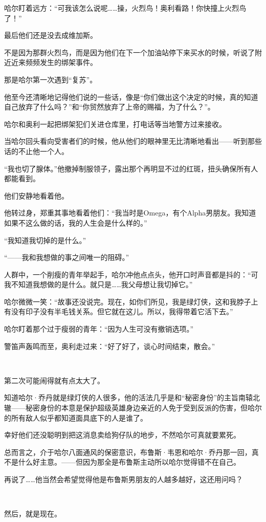 \documentclass[../main]{subfiles}
\begin{document}
哈尔盯着远方：“可我该怎么说呢……操，火烈鸟！奥利看路！你快撞上火烈鸟了！”

最后他们还是没去成维加斯。

不是因为那群火烈鸟，而是因为他们在下一个加油站停下来买水的时候，听说了附近近来频频发生的绑架事件。

那是哈尔第一次遇到“复苏”。

他至今还清晰地记得他们说的一些话，像是“你们做出这个决定的时候，真的知道自己放弃了什么吗？”和“你贸然放弃了上帝的赐福，为了什么？”。

哈尔和奥利一起把绑架犯们关进仓库里，打电话等当地警方过来接收。

当哈尔回头看向受害者们的时候，他从他们的眼神里无比清晰地看出——听到那些话的不止他一个人。

“我也切了腺体。”他撤掉制服领子，露出那个再明显不过的红斑，扭头确保所有人都能看到。

他们安静地看着他。

他转过身，郑重其事地看着他们：“我当时是Omega，有个Alpha男朋友。我知道如果不这么做的话，我的人生会是什么样的。”

“我知道我切掉的是什么。”

“——我和我想做的事之间唯一的阻碍。”

人群中，一个削瘦的青年举起手，哈尔冲他点点头，他开口时声音都是抖的：“可我不知道我想做的是什么。就只是……我父母想让我切掉它。”

哈尔微微一笑：“故事还没说完。现在，如你们所见，我是绿灯侠，这和我脖子上有没有印子没有半毛钱关系。但它就在这儿。所以，我得带着它活下去。”

哈尔盯着那个过于瘦弱的青年：“因为人生可没有撤销选项。”

警笛声轰鸣而至，奥利走过来：“好了好了，谈心时间结束，散会。”

~\

第二次可能闹得就有点太大了。

知道哈尔·乔丹就是绿灯侠的人很多，他的活法几乎是和“秘密身份”的主旨南辕北辙——秘密身份的本意是保护超级英雄身边亲近的人免于受到反派的伤害，但哈尔的所有敌人似乎都知道面具底下的人是谁了。

幸好他们还没聪明到把这消息卖给狗仔队的地步，不然哈尔可真就要累死。

总而言之，介于哈尔八面通风的保密意识，布鲁斯·韦恩和哈尔·乔丹那一回，真不是什么好主意。——但因为那全是布鲁斯主动所以哈尔觉得错不在自己。

再说了……他当然会希望觉得他是布鲁斯男朋友的人越多越好，这还用问吗？

~\

然后，就是现在。
\end{document}
